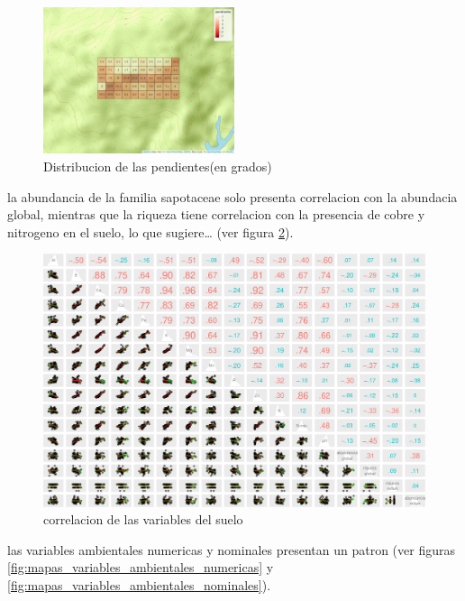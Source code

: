 \documentclass[11pt,]{article}
\begin{document}
\begin{figure}
\centering
\includegraphics[width=0.50000\textwidth]{mapa_cuadros_pendiente.png}
\caption{Distribucion de las pendientes(en
grados)\label{fig:mapa_cuadros_pendiente}}
\end{figure}

la abundancia de la familia sapotaceae solo presenta correlacion con la
abundacia global, mientras que la riqueza tiene correlacion con la
presencia de cobre y nitrogeno en el suelo, lo que sugiere\ldots{} (ver
figura \ref{fig:p_cor_suelo_ar}).

\begin{figure}
\centering
\includegraphics{manuscrito_files/figure-latex/unnamed-chunk-5-1.pdf}
\caption{\label{fig:p_cor_suelo_ar}correlacion de las variables del
suelo}
\end{figure}

las variables ambientales numericas y nominales presentan un patron (ver
figuras \ref{fig:mapas_variables_ambientales_numericas} y
\ref{fig:mapas_variables_ambientales_nominales}).
\end{document}

